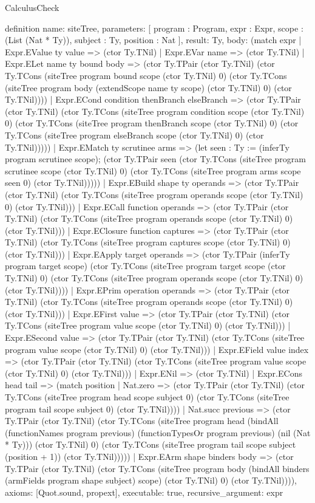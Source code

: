 \begin{lexlean}{CalculusCheck}
\begin{semanticmodule}
definition{
  name: siteTree,
  parameters: [
    program : Program,
    expr : Expr,
    scope : (List (Nat * Ty)),
    subject : Ty,
    position : Nat
  ],
  result: Ty,
  body: (match expr
    | Expr.EValue ty value => (ctor Ty.TNil)
    | Expr.EVar name => (ctor Ty.TNil)
    | Expr.ELet name ty bound body => (ctor Ty.TPair (ctor Ty.TNil) (ctor Ty.TCons (siteTree program bound scope (ctor Ty.TNil) 0) (ctor Ty.TCons (siteTree program body (extendScope name ty scope) (ctor Ty.TNil) 0) (ctor Ty.TNil))))
    | Expr.ECond condition thenBranch elseBranch => (ctor Ty.TPair (ctor Ty.TNil) (ctor Ty.TCons (siteTree program condition scope (ctor Ty.TNil) 0) (ctor Ty.TCons (siteTree program thenBranch scope (ctor Ty.TNil) 0) (ctor Ty.TCons (siteTree program elseBranch scope (ctor Ty.TNil) 0) (ctor Ty.TNil)))))
    | Expr.EMatch ty scrutinee arms => (let seen : Ty := (inferTy program scrutinee scope); (ctor Ty.TPair seen (ctor Ty.TCons (siteTree program scrutinee scope (ctor Ty.TNil) 0) (ctor Ty.TCons (siteTree program arms scope seen 0) (ctor Ty.TNil)))))
    | Expr.EBuild shape ty operands => (ctor Ty.TPair (ctor Ty.TNil) (ctor Ty.TCons (siteTree program operands scope (ctor Ty.TNil) 0) (ctor Ty.TNil)))
    | Expr.ECall function operands => (ctor Ty.TPair (ctor Ty.TNil) (ctor Ty.TCons (siteTree program operands scope (ctor Ty.TNil) 0) (ctor Ty.TNil)))
    | Expr.EClosure function captures => (ctor Ty.TPair (ctor Ty.TNil) (ctor Ty.TCons (siteTree program captures scope (ctor Ty.TNil) 0) (ctor Ty.TNil)))
    | Expr.EApply target operands => (ctor Ty.TPair (inferTy program target scope) (ctor Ty.TCons (siteTree program target scope (ctor Ty.TNil) 0) (ctor Ty.TCons (siteTree program operands scope (ctor Ty.TNil) 0) (ctor Ty.TNil))))
    | Expr.EPrim operation operands => (ctor Ty.TPair (ctor Ty.TNil) (ctor Ty.TCons (siteTree program operands scope (ctor Ty.TNil) 0) (ctor Ty.TNil)))
    | Expr.EFirst value => (ctor Ty.TPair (ctor Ty.TNil) (ctor Ty.TCons (siteTree program value scope (ctor Ty.TNil) 0) (ctor Ty.TNil)))
    | Expr.ESecond value => (ctor Ty.TPair (ctor Ty.TNil) (ctor Ty.TCons (siteTree program value scope (ctor Ty.TNil) 0) (ctor Ty.TNil)))
    | Expr.EField value index => (ctor Ty.TPair (ctor Ty.TNil) (ctor Ty.TCons (siteTree program value scope (ctor Ty.TNil) 0) (ctor Ty.TNil)))
    | Expr.ENil => (ctor Ty.TNil)
    | Expr.ECons head tail => (match position
      | Nat.zero => (ctor Ty.TPair (ctor Ty.TNil) (ctor Ty.TCons (siteTree program head scope subject 0) (ctor Ty.TCons (siteTree program tail scope subject 0) (ctor Ty.TNil))))
      | Nat.succ previous => (ctor Ty.TPair (ctor Ty.TNil) (ctor Ty.TCons (siteTree program head (bindAll (functionNames program previous) (functionTypesOr program previous) (nil (Nat * Ty))) (ctor Ty.TNil) 0) (ctor Ty.TCons (siteTree program tail scope subject (position + 1)) (ctor Ty.TNil)))))
    | Expr.EArm shape binders body => (ctor Ty.TPair (ctor Ty.TNil) (ctor Ty.TCons (siteTree program body (bindAll binders (armFields program shape subject) scope) (ctor Ty.TNil) 0) (ctor Ty.TNil)))),
  axioms: [Quot.sound, propext],
  executable: true,
  recursive_argument: expr
}


\end{semanticmodule}
\end{lexlean}
